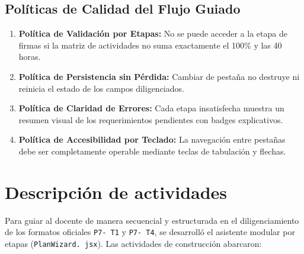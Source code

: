 \documentclass[12pt,a4paper]{article}
\begin{document}
\subsection{Políticas de Calidad del Flujo Guiado}
\begin{enumerate}[leftmargin=1.5em, itemsep=2pt]
    \item \textbf{Política de Validación por Etapas:} No se puede acceder a la etapa de firmas si la matriz de actividades no suma exactamente el 100\% y las 40 horas.
    \item \textbf{Política de Persistencia sin Pérdida:} Cambiar de pestaña no destruye ni reinicia el estado de los campos diligenciados.
    \item \textbf{Política de Claridad de Errores:} Cada etapa insatisfecha muestra un resumen visual de los requerimientos pendientes con badges explicativos.
    \item \textbf{Política de Accesibilidad por Teclado:} La navegación entre pestañas debe ser completamente operable mediante teclas de tabulación y flechas.
\end{enumerate}

\section{Descripción de actividades}
Para guiar al docente de manera secuencial y estructurada en el diligenciamiento de los formatos oficiales \texttt{P7- T1} y \texttt{P7- T4}, se desarrolló el asistente modular por etapas (\texttt{PlanWizard. jsx}). Las actividades de construcción abarcaron:
\end{document}
